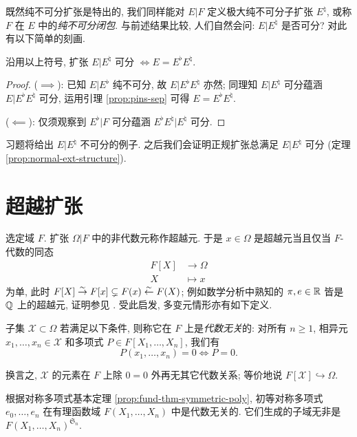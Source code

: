 既然纯不可分扩张是特出的, 我们同样能对 $E|F$ 定义极大纯不可分子扩张 $E^\natural$, 或称 $F$ 在 $E$ 中的\emph{纯不可分闭包}. 与前述结果比较, 人们自然会问: $E|E^\natural$ 是否可分? 对此有以下简单的刻画.
\begin{proposition}\label{prop:pins-compositum}
	沿用以上符号, 扩张 $E|E^\natural$ 可分 $\iff E = E^\flat E^\natural$.
\end{proposition}
\begin{proof}
	($\implies$): 已知 $E|E^\flat$ 纯不可分, 故 $E | E^\flat E^\natural$ 亦然; 同理知 $E|E^\natural$ 可分蕴涵 $E | E^\flat E^\natural$ 可分, 运用引理 \ref{prop:pins-sep} 可得 $E = E^\flat E^\natural$.
	
	($\impliedby$): 仅须观察到 $E^\flat|F$ 可分蕴涵 $E^\flat E^\natural | E^\natural$ 可分.
\end{proof}
习题将给出 $E|E^\natural$ 不可分的例子. 之后我们会证明正规扩张总满足 $E|E^\natural$ 可分 (定理 \ref{prop:normal-ext-structure}).

\section{超越扩张}
选定域 $F$. 扩张 $\Omega|F$ 中的非代数元称作超越元. 于是 $x \in \Omega$ 是超越元当且仅当 $F$-代数的同态
\begin{align*}
	F[X] & \longrightarrow \Omega \\
	X & \longmapsto x
\end{align*}
为单, 此时 $F[X] \stackrel{\sim}{\rightarrow} F[x] \subsetneq F(x) \stackrel{\sim}{\leftarrow} F(X)$; 例如数学分析中熟知的 $\pi, e \in \mathbb{R}$ 皆是 $\mathbb{Q}$ 上的超越元, 证明参见 \cite[\S 7]{ZhP}. 受此启发, 多变元情形亦有如下定义.

\begin{definition}\label{def:alg-indep}
	子集 $\mathcal{X} \subset \Omega$ 若满足以下条件, 则称它在 $F$ 上是\emph{代数无关}的: 对所有 $n \geq 1$, 相异元 $x_1, \ldots, x_n \in \mathcal{X}$ 和多项式 $P \in F[X_1, \ldots, X_n]$, 我们有
	\[ P(x_1, \ldots, x_n)=0 \iff P=0. \]
\end{definition}
换言之, $\mathcal{X}$ 的元素在 $F$ 上除 $0=0$ 外再无其它代数关系; 等价地说 $F[\mathcal{X}] \hookrightarrow \Omega$.

\begin{example}
	根据对称多项式基本定理 \ref{prop:fund-thm-symmetric-poly}, 初等对称多项式 $e_0, \ldots, e_n$ 在有理函数域 $F(X_1, \ldots, X_n)$ 中是代数无关的. 它们生成的子域无非是 $F(X_1, \ldots, X_n)^{\mathfrak{S}_n}$.
\end{example}

